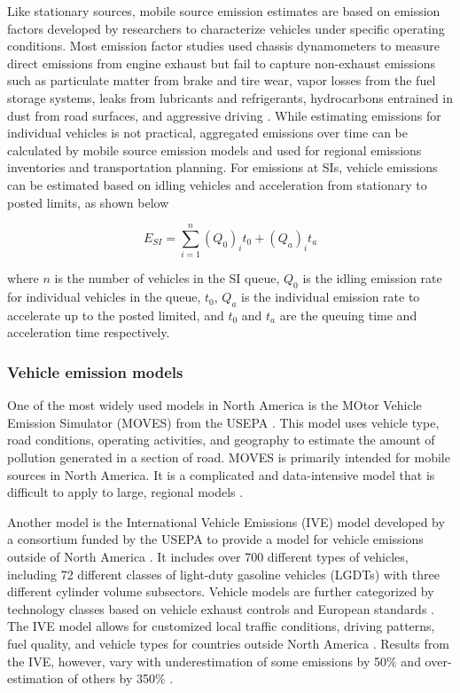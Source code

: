 \documentclass[preprint,12pt,a4paper]{elsarticle}
\begin{document}
\begin{linenumbers}
Like stationary sources, mobile source emission estimates are based on emission factors developed by researchers to characterize vehicles under specific operating conditions. Most emission factor studies used chassis dynamometers to measure direct emissions from engine exhaust but fail to capture non-exhaust emissions such as particulate matter from brake and tire wear, vapor losses from the fuel storage systems, leaks from lubricants and refrigerants, hydrocarbons entrained in dust from road surfaces, and aggressive driving \citep{Kam2012, Franco2013, Freeman2015a}. While estimating emissions for individual vehicles is not practical, aggregated emissions over time can be calculated by mobile source emission models and used for regional emissions inventories and transportation planning. For emissions at SIs, vehicle emissions can be estimated based on idling vehicles and acceleration from stationary to posted limits, as shown below

\begin{equation}
\label{eq:siemissions}
E_{SI}=\sum_{i=1}^{n}(Q_{0})_{i}t_{0} + (Q_{a})_{i}t_{a}
\end{equation}

\noindent
where $n$ is the number of vehicles in the SI queue, $Q_{0}$ is the idling emission rate for individual vehicles in the queue, $t_{0}$,  $Q_{a}$ is the individual emission rate to accelerate up to the posted limited, and $t_{0}$   and $t_{a}$ are the queuing time and acceleration time respectively.

\subsubsection{Vehicle emission models} \label{sssec:VehEmissionModels}

One of the most widely used models in North America is the MOtor Vehicle Emission Simulator (MOVES) from the USEPA \citep{MOVES2014a}. This model uses vehicle type, road conditions, operating activities, and geography to estimate the amount of pollution generated in a section of road. MOVES is primarily intended for mobile sources in North America. It is a complicated and data-intensive model that is difficult to apply to large, regional models \citep{Zhang2011}.

Another model is the International Vehicle Emissions (IVE) model developed by a consortium funded by the USEPA to provide a model for vehicle emissions outside of North America \citep{IVE2008}. It includes over 700 different types of vehicles, including 72 different classes of light-duty gasoline vehicles (LGDTs) with three different cylinder volume subsectors. Vehicle models are further categorized by technology classes based on vehicle exhaust controls and European standards \citep{Davis2005}. The IVE model allows for customized local traffic conditions, driving patterns, fuel quality, and vehicle types for countries outside North America \citep{Davis2010}. Results from the IVE, however, vary with underestimation of some emissions by 50\% and over-estimation of others by 350\% \citep{Hui2007}.


\end{linenumbers}
\end{document}
